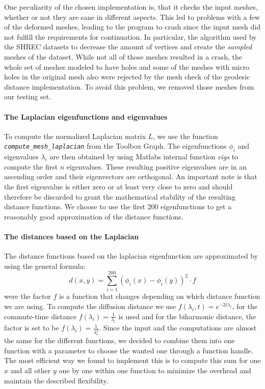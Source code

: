 One peculiarity of the chosen implementation is, that it checks the input meshes, whether or not they are sane in different aspects.
This led to problems with a few of the deformed meshes, leading to the program to crash since the input mesh did not fulfill the requirements for continuation.
In particular, the algorithm used by the SHREC datasets to decrease the amount of vertices and create the \textit{sampled} meshes of the dataset.
While not all of those meshes resulted in a crash, the whole set of meshes modeled to have holes and some of the meshes with micro holes in the original mesh also were rejected by the mesh check of the geodesic distance implementation.
To avoid this problem, we removed those meshes from our testing set.

\paragraph{The Laplacian eigenfunctions and eigenvalues}
To compute the normalized Laplacian matrix $L$, we use the function \textit{\texttt{compute\_mesh\_laplacian}} from the Toolbox Graph.
The eigenfunctions $\phi_i$ and eigenvalues $\lambda_i$ are then obtained by using Matlabs internal function \textit{eigs} to compute the first $n$ eigenvalues.
These resulting positive eigenvalues are in an ascending order and their eigenvectors are orthogonal.
An important note is that the first eigenvalue is either zero or at least very close to zero and should therefore be discarded to grant the mathematical stability of the resulting distance functions.
We choose to use the first 200 eigenfunctions to get a reasonably good approximation of the distance functions.

\paragraph{The distances based on the Laplacian}
The distance functions based on the laplacian eigenfunction are approximated by using the general formula:
\begin{equation}
	d(x,y) = \sum_{i=1}^{200} (\phi_i(x) - \phi_i(y))^2 \cdot f
\end{equation}
were the factor $f$ is a function that changes depending on which distance function we are using.
To compute the diffusion distance we use $f(\lambda_i,t) = e^{-2t\lambda_i}$, for the commute-time distance $f(\lambda_i) = \frac{1}{\lambda_i}$ is used and for the biharmonic distance, the factor is set to be $f(\lambda_i) = \frac{1}{\lambda_i^2}$.
Since the input and the computations are almost the same for the different functions, we decided to combine them into one function with a parameter to choose the wanted one through a function handle.
The most efficient way we found to implement this is to compute this sum for one $x$ and all other $y$ one by one within one function to minimize the overhead and maintain the described flexibility.

